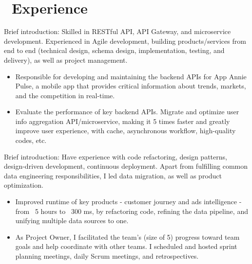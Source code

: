 \documentclass{resume}
\begin{document}



\section{\faUsers\ Experience}
\role{Web Backend Engineer}
Brief introduction: Skilled in RESTful API, API Gateway, and microservice development. Experienced in Agile development, building products/services from end to end (technical design, schema design, implementation, testing, and delivery), as well as project management.
\begin{itemize}
  \item Responsible for developing and maintaining the backend APIs for App Annie Pulse, a mobile app that provides critical information about trends, markets, and the competition in real-time.
  \item Evaluate the performance of key backend APIs. Migrate and optimize user info aggregation API/microservice, making it 5 times faster and greatly improve user experience, with cache, asynchronous workflow, high-quality codes, etc.
\end{itemize}

Brief introduction: Have experience with code refactoring, design patterns, design-driven development, continuous deployment. Apart from fulfilling common data engineering responsibilities, I led data migration, as well as product optimization.
\begin{itemize}
  \item Improved runtime of key products - customer journey and ads intelligence - from ~5 hours to ~300 ms, by refactoring code, refining the data pipeline, and unifying multiple data sources to one. 
  \item As Project Owner, I facilitated the team’s (size of 5) progress toward team goals and help coordinate with other teams. I scheduled and hosted sprint planning meetings, daily Scrum meetings, and retrospectives.
\end{itemize}
\end{document}
